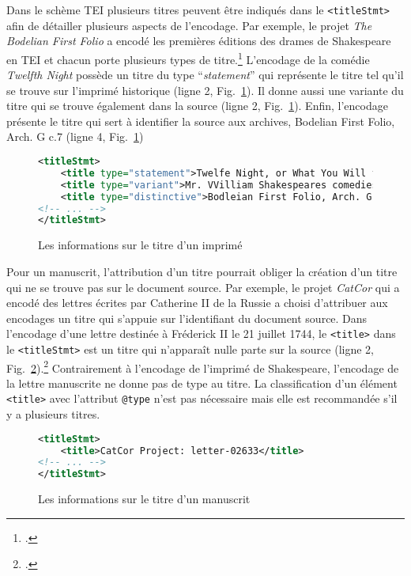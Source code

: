 \documentclass[class=article, crop=false]{standalone}
\begin{document}
Dans le schème \acrshort{TEI} plusieurs titres peuvent être indiqués dans le \texttt{<titleStmt>} afin de détailler plusieurs aspects de l'encodage. Par exemple, le projet \textit{The Bodelian First Folio} a encodé les premières éditions des drames de Shakespeare en \acrshort{TEI} et chacun porte plusieurs types de titre.\footcite{BodelianFirstFolio} L'encodage de la comédie \textit{Twelfth Night} possède un titre du type ``\textit{statement}'' qui représente le titre tel qu'il se trouve sur l'imprimé historique (ligne 2, Fig.~\ref{fig:printTitle}). Il donne aussi une variante du titre qui se trouve également dans la source (ligne 2, Fig.~\ref{fig:printTitle}). Enfin, l'encodage présente le titre qui sert à identifier la source aux archives, \og{}Bodelian First Folio, Arch. G c.7\fg{} (ligne 4, Fig.~\ref{fig:printTitle})

\begin{figure}[ht]
\centering
\begin{lstlisting}[language=XML]
<titleStmt>
	<title type="statement">Twelfe Night, or What You Will from Mr. William Shakespeares comedies, histories, &amp; tragedies. Published according to the true originall copies.</title>
	<title type="variant">Mr. VVilliam Shakespeares comedies, histories, &amp; tragedies</title>
	<title type="distinctive">Bodleian First Folio, Arch. G c.7</title>
<!-- ... -->
</titleStmt>
\end{lstlisting}
\caption{Les informations sur le titre d'un imprimé \protect\footnotemark}
\label{fig:printTitle}
\end{figure}

Pour un manuscrit, l'attribution d'un titre pourrait obliger la création d'un titre qui ne se trouve pas sur le document source. Par exemple, le projet \textit{CatCor} qui a encodé des lettres écrites par Catherine II de la Russie a choisi d'attribuer aux encodages un titre qui s'appuie sur l'identifiant du document source. Dans l'encodage d'une lettre destinée à Fréderick II le 21 juillet 1744, le \texttt{<title>} dans le \texttt{<titleStmt>} est un titre qui n'apparaît nulle parte sur la source (ligne 2, Fig.~\ref{fig:manuTitle}).\footcite{catcorprojectLetter02633Frederick2021} Contrairement à l'encodage de l'imprimé de Shakespeare, l'encodage de la lettre manuscrite ne donne pas de type au titre. La classification d'un élément \texttt{<title>} avec l'attribut \texttt{@type} n'est pas nécessaire mais elle est recommandée s'il y a plusieurs titres.

\begin{figure}[ht]
\centering
\begin{lstlisting}[language=XML]
<titleStmt>
	<title>CatCor Project: letter-02633</title>
<!-- ... -->
</titleStmt>
\end{lstlisting}
\caption{Les informations sur le titre d'un manuscrit \protect\footnotemark}
\label{fig:manuTitle}
\end{figure}
\end{document}
